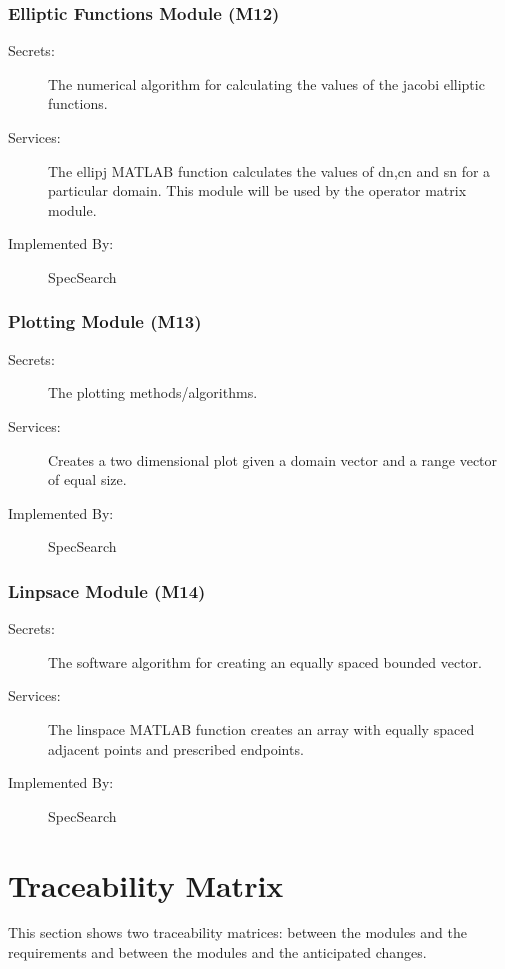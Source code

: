 \documentclass[12pt, titlepage]{article}
\begin{document}
\subsubsection{Elliptic Functions Module (M12)} 

\begin{description}
	\item[Secrets:] The numerical algorithm for calculating the values of the 
	jacobi elliptic functions. 
	\item[Services:] The ellipj MATLAB function calculates the values of dn,cn 
	and sn for a particular domain. This module will be used by the operator 
	matrix module. 
	\item[Implemented By:] SpecSearch
\end{description} 

\subsubsection{Plotting Module (M13)} 

\begin{description}
	\item[Secrets:] The plotting methods/algorithms.
	\item[Services:] Creates a two dimensional plot given a domain vector and a 
	range vector of equal size.  
	\item[Implemented By:] SpecSearch
\end{description} 

\subsubsection{Linpsace Module (M14)} 

\begin{description}
	\item[Secrets:] The software algorithm for creating an equally spaced 
	bounded vector. 
	\item[Services:] The linspace MATLAB function creates an array with equally 
	spaced adjacent points and prescribed endpoints. 
	\item[Implemented By:] SpecSearch
\end{description} 

\section{Traceability Matrix} \label{SecTM}

This section shows two traceability matrices: between the modules and the
requirements and between the modules and the anticipated changes.
\end{document}
